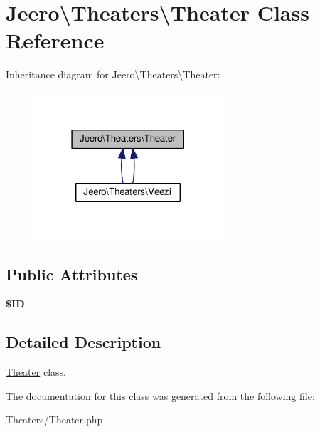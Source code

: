 \hypertarget{classJeero_1_1Theaters_1_1Theater}{}\section{Jeero\textbackslash{}Theaters\textbackslash{}Theater Class Reference}
\label{classJeero_1_1Theaters_1_1Theater}


Inheritance diagram for Jeero\textbackslash{}Theaters\textbackslash{}Theater\+:\nopagebreak
\begin{figure}[H]
\begin{center}
\leavevmode
\includegraphics[width=198pt]{classJeero_1_1Theaters_1_1Theater__inherit__graph}
\end{center}
\end{figure}
\subsection*{Public Attributes}
\begin{DoxyCompactItemize}
\item 
\mbox{\label{classJeero_1_1Theaters_1_1Theater_a1dd2ed0793c611738b97e74fa1f1f521}} 
{\bfseries \$\+ID}
\end{DoxyCompactItemize}


\subsection{Detailed Description}
\hyperlink{classJeero_1_1Theaters_1_1Theater}{Theater} class. 

The documentation for this class was generated from the following file\+:\begin{DoxyCompactItemize}
\item 
Theaters/Theater.\+php\end{DoxyCompactItemize}

